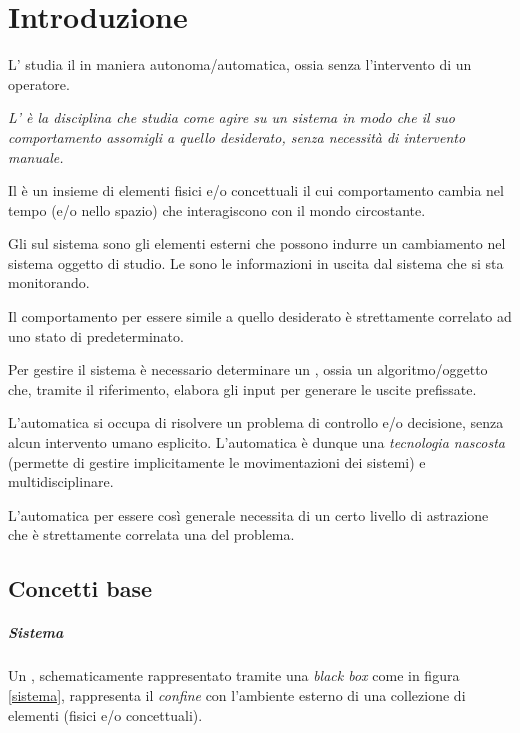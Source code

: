 \chapter{Introduzione}
	
	L' studia il  in maniera autonoma/automatica, ossia senza l'intervento di un operatore.
	
	\begin{concetto}
		\textit{L' è la disciplina che studia come agire su un sistema in modo che il suo comportamento assomigli a quello desiderato, senza necessità di intervento manuale.}
	\end{concetto}
	
	Il  è un insieme di elementi fisici e/o concettuali il cui comportamento cambia nel tempo (e/o nello spazio) che interagiscono con il mondo circostante.
	
	Gli  sul sistema sono gli elementi esterni che possono indurre un cambiamento nel sistema oggetto di studio. Le  sono le informazioni in uscita dal sistema che si sta monitorando.
	
	Il comportamento per essere simile a quello desiderato è strettamente correlato ad uno stato di  predeterminato.
	
	Per gestire il sistema è necessario determinare un , ossia un algoritmo/oggetto che, tramite il riferimento, elabora gli input per generare le uscite prefissate.
	
	\vspace{3mm} 
	L'automatica si occupa di risolvere un problema di controllo e/o decisione, senza alcun intervento umano esplicito. L'automatica è dunque una \textit{tecnologia nascosta} (permette di gestire implicitamente le movimentazioni dei sistemi) e multidisciplinare.
	
	L'automatica per essere così generale necessita di un certo livello di astrazione che è strettamente correlata una  del problema.
	
\section{Concetti base}

	\paragraph{Sistema} Un , schematicamente rappresentato tramite una \textit{black box} come in figura \ref{sistema}, rappresenta il \textit{confine} con l'ambiente esterno di una collezione di elementi (fisici e/o concettuali).
	
